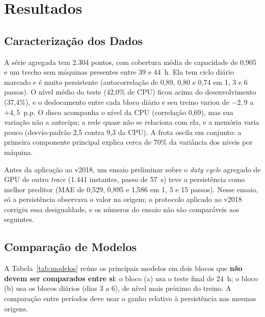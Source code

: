 \documentclass[a4paper,12pt]{article}
\begin{document}

\section{Resultados}

\subsection{Caracterização dos Dados}
\label{sec:caracterizacao}

A série agregada tem 2.304 pontos, com cobertura média de capacidade de 0,905 e um trecho sem máquinas presentes entre 39 e 44~h. Ela tem ciclo diário marcado e é muito persistente (autocorrelação de 0,89, 0,80 e 0,74 em 1, 3 e 6 passos). O nível médio do teste (42,0\% de CPU) ficou acima do desenvolvimento (37,4\%), e o deslocamento entre cada bloco diário e seu treino variou de $-2{,}9$ a $+4{,}5$~p.p. O disco acompanha o nível da CPU (correlação 0,69), mas sua variação não a antecipa; a rede quase não se relaciona com ela, e a memória varia pouco (desvio-padrão 2,5 contra 9,3 da CPU). A frota oscila em conjunto: a primeira componente principal explica cerca de 70\% da variância dos níveis por máquina.

Antes da aplicação ao v2018, um ensaio preliminar sobre o \textit{duty cycle} agregado de GPU de outro \textit{trace} (1.441 instantes, passo de 57~s) teve a persistência como melhor preditor (MAE de 0,529, 0,895 e 1,586 em 1, 5 e 15 passos). Nesse ensaio, só a persistência observava o valor na origem; o protocolo aplicado ao v2018 corrigiu essa desigualdade, e os números do ensaio não são comparáveis aos seguintes.

\subsection{Comparação de Modelos}
\label{sec:comparacao}

A Tabela~\ref{tab:modelos} reúne os principais modelos em dois blocos que \textbf{não devem ser comparados entre si}: o bloco (a) usa o teste final de 24~h; o bloco (b) usa os blocos diários (dias 3 a 6), de nível mais próximo do treino. A comparação entre períodos deve usar o ganho relativo à persistência nas mesmas origens.
\end{document}

